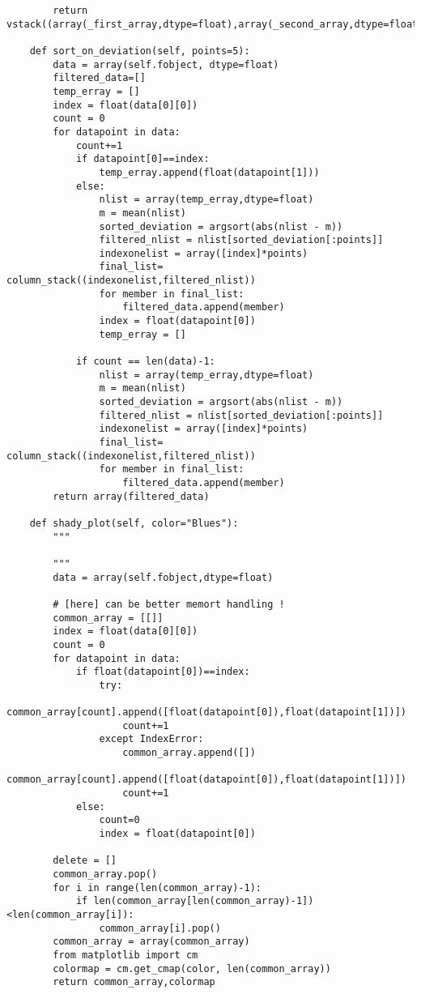 \documentclass[12pt]{article}
\begin{document}
\begin{verbatim}
        return vstack((array(_first_array,dtype=float),array(_second_array,dtype=float))).T
        
    def sort_on_deviation(self, points=5):
        data = array(self.fobject, dtype=float)
        filtered_data=[]
        temp_erray = []
        index = float(data[0][0])
        count = 0
        for datapoint in data:
            count+=1
            if datapoint[0]==index:
                temp_erray.append(float(datapoint[1]))
            else:
                nlist = array(temp_erray,dtype=float)
                m = mean(nlist)
                sorted_deviation = argsort(abs(nlist - m))
                filtered_nlist = nlist[sorted_deviation[:points]]
                indexonelist = array([index]*points)
                final_list= column_stack((indexonelist,filtered_nlist))
                for member in final_list:
                    filtered_data.append(member)
                index = float(datapoint[0])
                temp_erray = []

            if count == len(data)-1:
                nlist = array(temp_erray,dtype=float)
                m = mean(nlist)
                sorted_deviation = argsort(abs(nlist - m))
                filtered_nlist = nlist[sorted_deviation[:points]]
                indexonelist = array([index]*points)
                final_list= column_stack((indexonelist,filtered_nlist))
                for member in final_list:
                    filtered_data.append(member)
        return array(filtered_data)
    
    def shady_plot(self, color="Blues"):
        """
        
        """
        data = array(self.fobject,dtype=float)
        
        # [here] can be better memort handling !
        common_array = [[]]
        index = float(data[0][0])
        count = 0
        for datapoint in data:
            if float(datapoint[0])==index:
                try:
                    common_array[count].append([float(datapoint[0]),float(datapoint[1])])
                    count+=1
                except IndexError:
                    common_array.append([])
                    common_array[count].append([float(datapoint[0]),float(datapoint[1])])
                    count+=1
            else:
                count=0
                index = float(datapoint[0])

        delete = []
        common_array.pop()
        for i in range(len(common_array)-1):    
            if len(common_array[len(common_array)-1])<len(common_array[i]):
                common_array[i].pop()
        common_array = array(common_array)
        from matplotlib import cm
        colormap = cm.get_cmap(color, len(common_array))
        return common_array,colormap
        

\end{verbatim}
\end{document}
